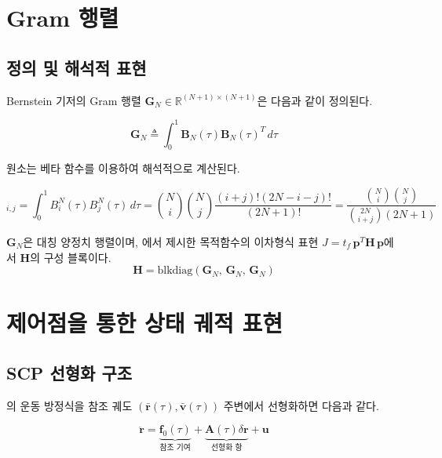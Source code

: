 \documentclass[11pt]{article}
\begin{document}
\section{Gram 행렬}

\subsection{정의 및 해석적 표현}

Bernstein 기저의 Gram 행렬 $\mathbf{G}_N \in \mathbb{R}^{(N+1)\times(N+1)}$은 다음과 같이 정의된다.

\begin{equation}
  \mathbf{G}_N \triangleq \int_0^1 \mathbf{B}_N(\tau)\mathbf{B}_N(\tau)^T\,d\tau
  \label{eq:gram}
\end{equation}

원소는 베타 함수를 이용하여 해석적으로 계산된다.

\begin{equation}
  [\mathbf{G}_N]_{i,j} = \int_0^1 B_i^N(\tau)B_j^N(\tau)\,d\tau
  = \binom{N}{i}\binom{N}{j}\frac{(i+j)!(2N-i-j)!}{(2N+1)!}
  = \frac{\binom{N}{i}\binom{N}{j}}{\binom{2N}{i+j}(2N+1)}
  \label{eq:gram_elements}
\end{equation}

$\mathbf{G}_N$은 대칭 양정치 행렬이며, \cite{report003}에서 제시한 목적함수의 이차형식 표현
$J = t_f\,\mathbf{p}^T \mathbf{H}\,\mathbf{p}$에서 $\mathbf{H}$의 구성 블록이다.
\begin{equation}
  \mathbf{H} = \mathrm{blkdiag}(\mathbf{G}_N,\, \mathbf{G}_N,\, \mathbf{G}_N)
\end{equation}

\section{제어점을 통한 상태 궤적 표현}

\subsection{SCP 선형화 구조}

\cite{report002}의 운동 방정식을 참조 궤도 $(\bar{\mathbf{r}}(\tau), \bar{\mathbf{v}}(\tau))$ 주변에서
선형화하면 다음과 같다.

\begin{equation}
  \ddot{\mathbf{r}} = \underbrace{\mathbf{f}_0(\tau)}_{\text{참조 기여}} + \underbrace{\mathbf{A}(\tau)\delta\mathbf{r}}_{\text{선형화 항}} + \mathbf{u}
  \label{eq:linearized}
\end{equation}
\end{document}
